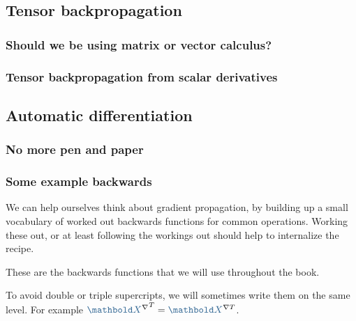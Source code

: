 \documentclass{pca}
\newcommand{\bc}[1]{{\color{my-blue} #1}}
\newcommand{\mbX}{\mathbold X}
\theoremstyle{theorem}
\theoremstyle{definition}
\theoremstyle{proof}
\begin{document}
\subsection{Tensor backpropagation}

\subsubsection{Should we be using matrix or vector calculus?}

\subsubsection{Tensor backpropagation from scalar derivatives}

\subsection{Automatic differentiation}

\subsubsection{No more pen and paper}

\subsubsection{Some example backwards}

We can help ourselves think about gradient propagation, by building up a small vocabulary of worked out backwards functions for common operations. Working these out, or at least following the workings out should help to internalize the recipe. 

These are the backwards functions that we will use throughout the book.

To avoid double or triple supercripts, we will sometimes write them on the same level. For example ${\bc{\mbX}^\nabla}^T = \bc{\mbX}^{\nabla T}$.
\end{document}
